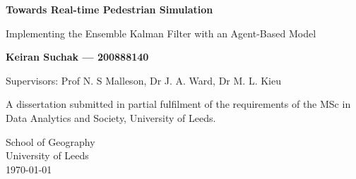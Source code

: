 \begin{titlepage}
    \begin{center}
        \vspace*{1cm}
        
        \Huge
        \textbf{Towards Real-time Pedestrian Simulation}

        \vspace{0.5cm}
        \LARGE
        Implementing the Ensemble Kalman Filter with an Agent-Based Model

        \vspace{1.5cm}
        
        \textbf{Keiran Suchak --- 200888140}

        \vspace{0.5cm}

        \large
        Supervisors: Prof N. S Malleson, Dr J. A. Ward, Dr M. L. Kieu

        \vfill
        A dissertation submitted in partial fulfilment of the requirements of
        the MSc in Data Analytics and Society, University of Leeds.

        \vspace{0.8cm}

        \Large
        School of Geography\\
        University of Leeds\\
        \today

    \end{center}
\end{titlepage}
